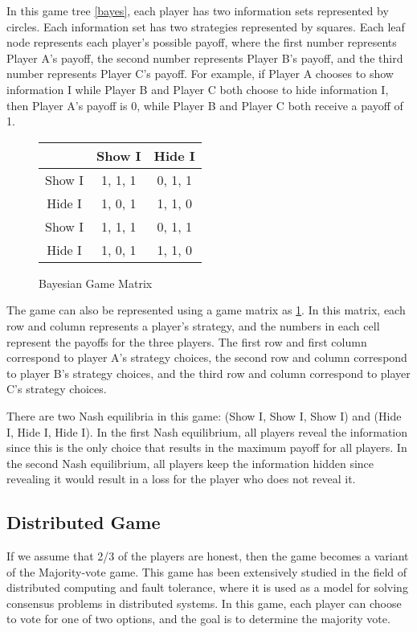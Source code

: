 \documentclass[twocolumn]{article}
\begin{document}
In this game tree \ref{bayes}, each player has two information sets represented by circles. Each information set has two strategies represented by squares. Each leaf node represents each player's possible payoff, where the first number represents Player A's payoff, the second number represents Player B's payoff, and the third number represents Player C's payoff. For example, if Player A chooses to show information I while Player B and Player C both choose to hide information I, then Player A's payoff is 0, while Player B and Player C both receive a payoff of 1.

\begin{figure}[htbp]
\begin{tabular}{c|cc}
& Show I & Hide I \\
\hline
Show I & 1, 1, 1 & 0, 1, 1 \\
Hide I & 1, 0, 1 & 1, 1, 0 \\
Show I & 1, 1, 1 & 0, 1, 1 \\
  Hide I & 1, 0, 1 & 1, 1, 0 \\
\end{tabular}
  \label{bayes mat}
  \caption{Bayesian Game Matrix}
\end{figure}


The game can also be represented using a game matrix as \ref{bayes mat}. In this matrix, each row and column represents a player's strategy, and the numbers in each cell represent the payoffs for the three players. The first row and first column correspond to player A's strategy choices, the second row and column correspond to player B's strategy choices, and the third row and column correspond to player C's strategy choices.

There are two Nash equilibria in this game: (Show I, Show I, Show I) and (Hide I, Hide I, Hide I). In the first Nash equilibrium, all players reveal the information since this is the only choice that results in the maximum payoff for all players. In the second Nash equilibrium, all players keep the information hidden since revealing it would result in a loss for the player who does not reveal it.

\subsection{Distributed Game}
If we assume that 2/3 of the players are honest, then the game becomes a variant of the Majority-vote game. This game has been extensively studied in the field of distributed computing and fault tolerance, where it is used as a model for solving consensus problems in distributed systems. In this game, each player can choose to vote for one of two options, and the goal is to determine the majority vote.
\end{document}
